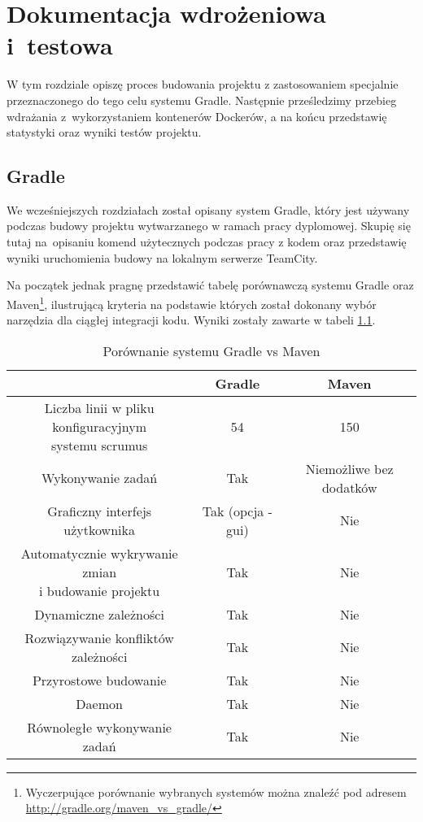 \chapter{Dokumentacja wdrożeniowa i~testowa}
W tym rozdziale opiszę proces budowania projektu z zastosowaniem specjalnie przeznaczonego do tego celu systemu Gradle. Następnie prześledzimy przebieg wdrażania z~wykorzystaniem kontenerów Dockerów, a na końcu przedstawię statystyki oraz wyniki testów projektu.

\section{Gradle}
We wcześniejszych rozdziałach został opisany system Gradle, który jest używany podczas budowy projektu wytwarzanego w ramach pracy dyplomowej. Skupię się tutaj na~opisaniu komend użytecznych podczas pracy z kodem oraz przedstawię wyniki uruchomienia budowy na lokalnym serwerze TeamCity.

Na początek jednak pragnę przedstawić tabelę porównawczą systemu Gradle oraz Maven\footnote{Wyczerpujące porównanie wybranych systemów można znaleźć pod adresem \url{http://gradle.org/maven_vs_gradle/}}, ilustrującą kryteria na podstawie których został dokonany wybór narzędzia dla ciągłej integracji kodu. Wyniki zostały zawarte w tabeli \ref{tabela:gradle_vs_maven}.

\begin{table}[h!]
	\caption{Porównanie systemu Gradle vs Maven}
	\centering
	\begin{tabular}{|c|c|c|}
		\hline
		& Gradle & Maven \\
		\hline
		\specialcell{Liczba linii w pliku konfiguracyjnym\\ systemu scrumus} & 54 & 150 \\
		\hline		
		Wykonywanie zadań & Tak & Niemożliwe bez dodatków \\
		\hline		
		Graficzny interfejs użytkownika & Tak (opcja -gui) & Nie \\
		\hline		
		\specialcell{Automatycznie wykrywanie zmian\\ i budowanie projektu} & Tak & Nie \\
		\hline	
		Dynamiczne zależności & Tak & Nie \\
		\hline	
		Rozwiązywanie konfliktów zależności & Tak & Nie \\
		\hline	
		Przyrostowe budowanie & Tak & Nie \\
		\hline	
		Daemon & Tak & Nie \\
		\hline	
		Równoległe wykonywanie zadań & Tak & Nie \\
		\hline	
	\end{tabular}
	\label{tabela:gradle_vs_maven}
\end{table}

